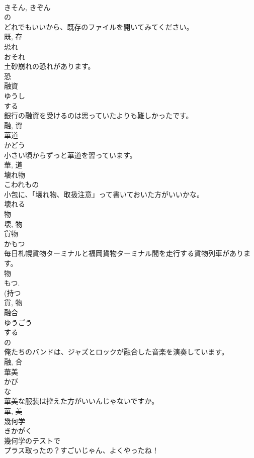 \documentclass[8pt]{extreport}
\begin{document}
\begin{CJK}{UTF8}{min}
\\	きそん, きぞん	
\\	の 
\\	どれでもいいから、既存のファイルを開いてみてください。	
\\	既, 存	
\\	恐れ	
\\	おそれ	
\\	土砂崩れの恐れがあります。	
\\	恐	
\\	融資	
\\	ゆうし	
\\	する 
\\	銀行の融資を受けるのは思っていたよりも難しかったです。	
\\	融, 資	
\\	華道	
\\	かどう	
\\	小さい頃からずっと華道を習っています。	
\\	華, 道	
\\	壊れ物	
\\	こわれもの	
\\	小包に、「壊れ物、取扱注意」って書いておいた方がいいかな。	
\\	壊れる 
\\	物 
\\	壊, 物	
\\	貨物	
\\	かもつ	
\\	毎日札幌貨物ターミナルと福岡貨物ターミナル間を走行する貨物列車があります。	
\\	物 
\\	もつ. 
\\	(持つ 
\\	貨, 物	
\\	融合	
\\	ゆうごう	
\\	する 
\\	の 
\\	俺たちのバンドは、ジャズとロックが融合した音楽を演奏しています。	
\\	融, 合	
\\	華美	
\\	かび	
\\	な 
\\	華美な服装は控えた方がいいんじゃないですか。	
\\	華, 美	
\\	幾何学	
\\	きかがく	
\\	幾何学のテストで
\\	プラス取ったの？すごいじゃん、よくやったね！	

\end{CJK}
\end{document}
